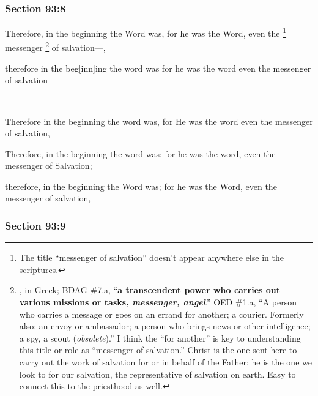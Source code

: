 	\subsubsection{Section 93:8} %
		\label{DC93-8}

		Therefore, in the beginning the Word was, for he was the Word, even the
			\footnote{%
			The title ``messenger of salvation'' doesn't appear anywhere else in the scriptures.
			}%
		messenger%
			\footnote{%
				, in Greek; BDAG \#7.a, ``\textbf{a transcendent power who carries out various missions or tasks, \textit{messenger, angel}}.'' OED \#1.a, ``A person who carries a message or goes on an errand for another; a courier. Formerly also: an envoy or ambassador; a person who brings news or other intelligence; a spy, a scout (\textit{obsolete}).'' I think the ``for another'' is key to understanding this title or role as ``messenger of salvation.'' Christ is the one sent here to carry out the work of salvation for or in behalf of the Father; he is the one we look to for our salvation, the representative of salvation on earth. Easy to connect this to the priesthood as well.
				}
		of salvation---,

		\begin{framed}
		\scriptsize
			\begin{compactdesc}
				\item[JSP] therefore in the beg[inn]ing the word was for he was the word even the messenger of salvation
				\item[BC] ---
				\item[RB2] Therefore in the beginning the word was, for He was the word even the messenger of salvation, 
				\item[RB1] Therefore, in the beginning the word was; for he was the word, even the messenger of Salvation; 
				\item[DC 1835] therefore, in the beginning the Word was; for he was the Word, even the messenger of salvation, 
			\end{compactdesc}
		\end{framed}

	\subsubsection{Section 93:9} %
		\label{DC93-9}


